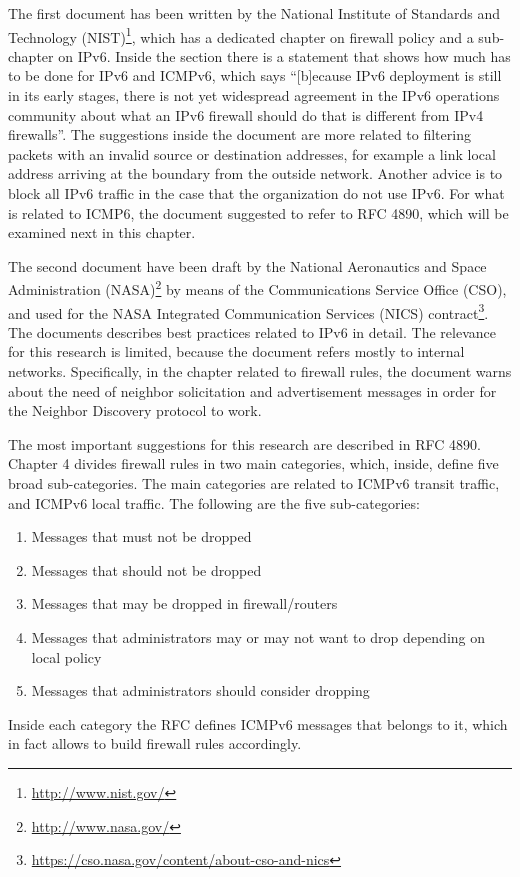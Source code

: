 \documentclass[12pt]{article}
\begin{document}
The first document has been written by the National Institute of Standards and Technology (NIST)\footnote{\url{http://www.nist.gov/}}, which has a dedicated chapter on firewall policy and a sub-chapter on IPv6. Inside the section there is a statement that shows how much has to be done for IPv6 and ICMPv6, which says ``[b]ecause IPv6 deployment is still in its early stages, there is not yet widespread agreement in the IPv6 operations community about what an IPv6 firewall should do that is different from IPv4 firewalls''. The suggestions inside the document are more related to filtering packets with an invalid source or destination addresses, for example a link local address arriving at the boundary from the outside network. Another advice is to block all IPv6 traffic in the case that the organization do not use IPv6. For what is related to ICMP6, the document suggested to refer to RFC 4890, which will be examined next in this chapter.\cite{nist}

The second document have been draft by the National Aeronautics and Space Administration (NASA)\footnote{\url{http://www.nasa.gov/}} by means of the Communications Service Office (CSO), and used for the NASA Integrated Communication Services (NICS) contract\footnote{\url{https://cso.nasa.gov/content/about-cso-and-nics}}. The documents describes best practices related to IPv6 in detail. The relevance for this research is limited, because the document refers mostly to internal networks. Specifically, in the chapter related to firewall rules, the document warns about the need of neighbor solicitation and advertisement messages in order for the Neighbor Discovery protocol to work\cite{nics}.

The most important suggestions for this research are described in RFC 4890. Chapter 4 divides firewall rules in two main categories, which, inside, define five broad sub-categories. The main categories are related to ICMPv6 transit traffic, and ICMPv6 local traffic. The following are the five sub-categories:

\vspace{-15pt}
\begin{enumerate}[noitemsep,topsep=0pt,partopsep=0pt]
 \item Messages that must not be dropped
 \item Messages that should not be dropped
 \item Messages that may be dropped in firewall/routers
 \item Messages that administrators may or may not want to drop depending on local policy
 \item Messages that administrators should consider dropping
\end{enumerate}
Inside each category the RFC defines ICMPv6 messages that belongs to it, which in fact allows to build firewall rules accordingly\cite{rfc4890}.
\end{document}
